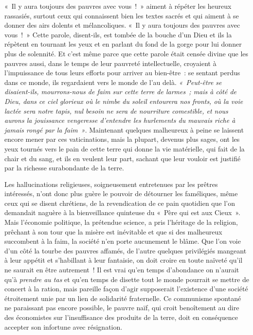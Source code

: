 \documentclass[french,twoside]{book} %
\begin{document}
« Il y aura toujours des pauvres avec vous ! » aiment à répéter les heureux rassasiés, surtout ceux qui connaissent bien les textes sacrés et qui aiment à se donner des airs dolents et mélancoliques.  « Il y aura toujours des pauvres avec vous ! » Cette parole, disent-ils, est tombée de la bouche d’un Dieu et ils la répètent en tournant les yeux et en parlant du fond de la gorge pour lui donner plus de solennité. Et c’est même parce que cette parole était censée divine que les pauvres aussi, dans le temps de leur pauvreté intellectuelle, croyaient à l’impuissance de tous leurs efforts pour arriver au bien-être : se sentant perdus dans ce monde, ils regardaient vers le monde de l’au delà. \emph{« Peut-être se disaient-ils, mourrons-nous de faim sur cette terre de larmes ; mais à côté de Dieu, dans ce ciel glorieux où le nimbe du soleil entourera nos fronts, où la voie lactée sera notre tapis, nul besoin ne sera de nourriture comestible,  et nous aurons la jouissance vengeresse d’entendre les hurlements du mauvais riche à jamais rongé par la faim »}. Maintenant quelques malheureux à peine se laissent encore mener par ces vaticinations, mais la plupart, devenus plus sages, ont les yeux tournés vers le pain de cette terre qui donne la vie matérielle, qui fait de la chair et du sang, et ils en veulent leur part, sachant que leur vouloir est justifié par la richesse surabondante de la terre.\par
Les hallucinations religieuses, soigneusement entretenues par les prêtres intéressés, n’ont donc plus guère le pouvoir de détourner les faméliques, même ceux qui se disent chrétiens, de la revendication de ce pain quotidien que l’on demandait naguère à la bienveillance  quinteuse du « Père qui est aux Cieux ». Mais l’économie politique, la prétendue science, a pris l’héritage de la religion, prêchant à son tour que la misère est inévitable et que si des malheureux succombent à la faim, la société n’en porte aucunement le blâme. Que l’on voie d’un côté la tourbe des pauvres affamés, de l’autre quelques privilégiés mangeant à leur appétit et s’habillant à leur fantaisie, on doit croire en toute naïveté qu’il ne saurait en être autrement ! Il est vrai qu’en temps d’abondance on n’aurait qu’à \emph{prendre au tas} et qu’en temps de disette tout le monde pourrait se mettre de concert à la ration, mais pareille façon d’agir supposerait l’existence d’une société étroitement unie par un lien de solidarité fraternelle. Ce communisme  spontané ne paraissant pas encore possible, le pauvre naïf, qui croit benoîtement au dire des économistes sur l’insuffisance des produits de la terre, doit en conséquence accepter son infortune avec résignation.\par
\end{document}
